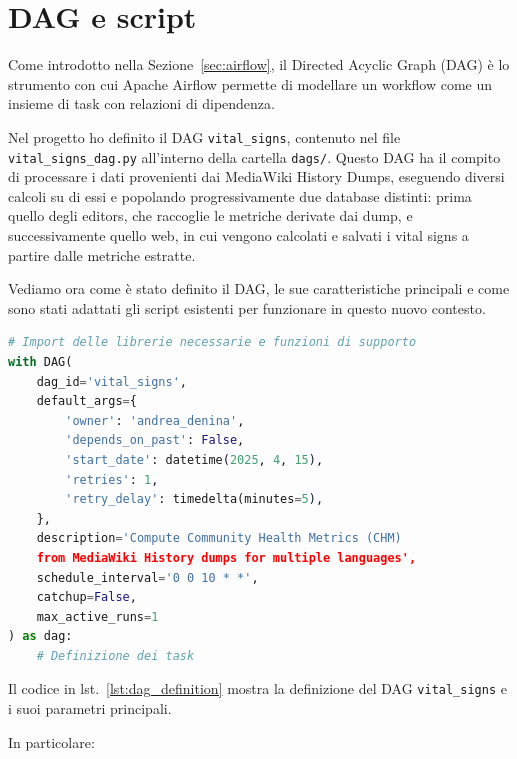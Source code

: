 \section{DAG e script}
\label{sec:dag_script}

Come introdotto nella Sezione~\ref{sec:airflow}, il Directed Acyclic Graph (DAG) è lo strumento con cui Apache Airflow permette di modellare un workflow come un insieme di task con relazioni di dipendenza.

Nel progetto ho definito il DAG \texttt{vital\_signs}, contenuto nel file \texttt{vital\_signs\_dag.py} all’interno della cartella \texttt{dags/}. Questo DAG ha il compito di processare i dati provenienti dai MediaWiki History Dumps, eseguendo diversi calcoli su di essi e popolando progressivamente due database distinti: prima quello degli editors, che raccoglie le metriche derivate dai dump, e successivamente quello web, in cui vengono calcolati e salvati i vital signs a partire dalle metriche estratte.

Vediamo ora come è stato definito il DAG, le sue caratteristiche principali e come sono stati adattati gli script esistenti per funzionare in questo nuovo contesto.


\begin{lstlisting}[language=Python, caption=Definizione del DAG in Airflow, label=lst:dag_definition, basicstyle=\scriptsize\ttfamily, showstringspaces=false]
# Import delle librerie necessarie e funzioni di supporto
with DAG(
    dag_id='vital_signs',
    default_args={
        'owner': 'andrea_denina',
        'depends_on_past': False,
        'start_date': datetime(2025, 4, 15),
        'retries': 1,
        'retry_delay': timedelta(minutes=5),
    },
    description='Compute Community Health Metrics (CHM)
    from MediaWiki History dumps for multiple languages',
    schedule_interval='0 0 10 * *',
    catchup=False,
    max_active_runs=1
) as dag:
    # Definizione dei task
\end{lstlisting}

Il codice in lst.~\ref{lst:dag_definition} mostra la definizione del DAG \texttt{vital\_signs} e i suoi parametri principali.

In particolare:

